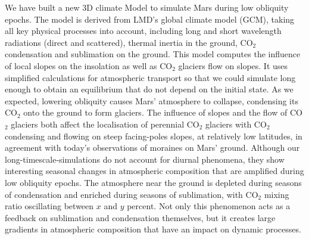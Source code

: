 
We have built a new 3D climate Model to simulate Mars during low obliquity epochs.
The model is derived from LMD's global climate model (GCM), taking all key physical processes
into account, including long and short wavelength radiations (direct and scattered), thermal inertia
in the ground, CO$_2$ condensation and sublimation on the ground. This model computes the influence
of local slopes on the insolation as well as CO$_2$ glaciers flow on slopes. It uses simplified 
calculations for atmospheric transport so that we could simulate long enough to obtain an equilibrium that 
do not depend on the initial state. As we expected, lowering obliquity causes Mars' atmosphere to collapse,
condensing its CO$_2$ onto the ground to form glaciers.
The influence of slopes and the flow of CO$_2$ glaciers both affect the localisation of perennial CO$_2$ glaciers
with CO$_2$ condensing and flowing on steep facing-poles slopes, at relatively low latitudes, in agreement 
with today's observations of moraines on Mars' ground.  
Although our long-timescale-simulations do not account for diurnal phenomena,
they show interesting seasonal changes in atmospheric composition that are amplified during low obliquity epochs.
The atmosphere near the ground is depleted during seasons of condensation and enriched during seasons of
sublimation, with CO$_2$ mixing ratio oscillating between $x$ and $y$ percent. Not only this phenomenon acts
as a feedback on sublimation and condensation themselves, but it creates large gradients in atmospheric composition
that have an impact on dynamic processes.
